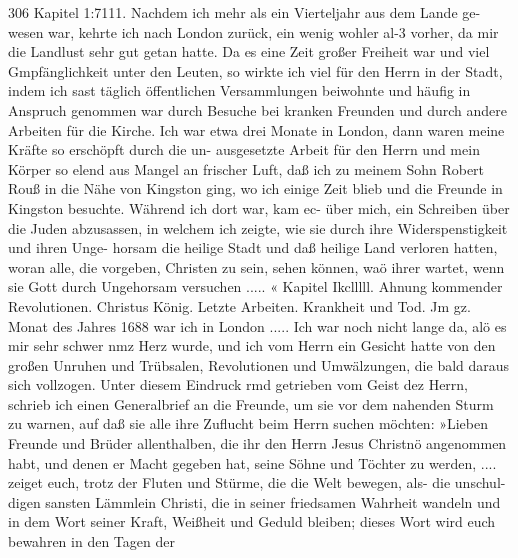 306 Kapitel 1:7111.
Nachdem ich mehr als ein Vierteljahr aus dem Lande ge-
wesen war, kehrte ich nach London zurück, ein wenig wohler al-3
vorher, da mir die Landlust sehr gut getan hatte. Da es eine
Zeit großer Freiheit war und viel Gmpfänglichkeit unter den
Leuten, so wirkte ich viel für den Herrn in der Stadt, indem ich
sast täglich öffentlichen Versammlungen beiwohnte und häufig in
Anspruch genommen war durch Besuche bei kranken Freunden und
durch andere Arbeiten für die Kirche. Ich war etwa drei Monate
in London, dann waren meine Kräfte so erschöpft durch die un-
ausgesetzte Arbeit für den Herrn und mein Körper so elend aus
Mangel an frischer Luft, daß ich zu meinem Sohn Robert Rouß
in die Nähe von Kingston ging, wo ich einige Zeit blieb und die
Freunde in Kingston besuchte. Während ich dort war, kam ec-
über mich, ein Schreiben über die Juden abzusassen, in welchem
ich zeigte, wie sie durch ihre Widerspenstigkeit und ihren Unge-
horsam die heilige Stadt und daß heilige Land verloren hatten,
woran alle, die vorgeben, Christen zu sein, sehen können, waö
ihrer wartet, wenn sie Gott durch Ungehorsam versuchen ..... «
Kapitel Ikclllll.
Ahnung kommender Revolutionen. Christus König. Letzte
Arbeiten. Krankheit und Tod.
Jm gz. Monat des Jahres 1688 war ich in London .....
Ich war noch nicht lange da, alö es mir sehr schwer nmz Herz
wurde, und ich vom Herrn ein Gesicht hatte von den großen
Unruhen und Trübsalen, Revolutionen und Umwälzungen, die bald
daraus sich vollzogen. Unter diesem Eindruck rmd getrieben vom
Geist dez Herrn, schrieb ich einen Generalbrief an die Freunde,
um sie vor dem nahenden Sturm zu warnen, auf daß sie alle
ihre Zuflucht beim Herrn suchen möchten:
»Lieben Freunde und Brüder allenthalben, die ihr den Herrn
Jesus Christnö angenommen habt, und denen er Macht gegeben
hat, seine Söhne und Töchter zu werden, .... zeiget euch, trotz
der Fluten und Stürme, die die Welt bewegen, als- die unschul-
digen sansten Lämmlein Christi, die in seiner friedsamen Wahrheit
wandeln und in dem Wort seiner Kraft, Weißheit und Geduld
bleiben; dieses Wort wird euch bewahren in den Tagen der


